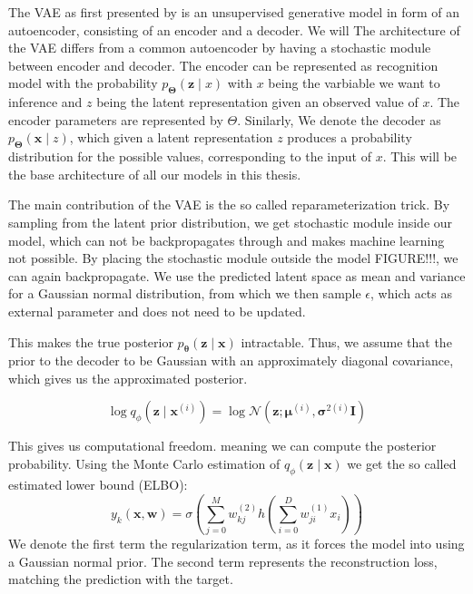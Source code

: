 The VAE as first presented by \cite{kingma_auto-encoding_2014} is an unsupervised generative model in form of an autoencoder, consisting of an encoder and a decoder. We will The architecture of the VAE differs from a common autoencoder by having a stochastic module between encoder and decoder. The encoder can be represented as recognition model with the probability $p_{\boldsymbol{\Theta}}(\mathbf{z} \mid x)$ with $x$ being the varbiable we want to inference and $z$ being the latent representation given an observed value of $x$. The encoder parameters are represented by $\Theta$. Sinilarly, We denote the decoder as $p_{\boldsymbol{\Theta}}(\mathbf{x} \mid z)$, which given a latent representation $z$ produces a probability distribution for the possible values, corresponding to the input of $x$. This will be the base architecture of all our models in this thesis.

The main contribution of the VAE is the so called reparameterization trick. By sampling from the latent prior distribution, we get stochastic module inside our model, which can not be backpropagates through and makes machine learning not possible. By placing the stochastic module outside the model FIGURE!!!, we can again backpropagate. We use the predicted latent space as mean and variance for a Gaussian normal distribution, from which we then sample $\epsilon$, which acts as external parameter and does not need to be updated.

This makes the true posterior $p_{\boldsymbol{\theta}}(\mathbf{z} \mid \mathbf{x})$ intractable. Thus, we assume that the prior to the decoder to be Gaussian with an approximately diagonal covariance, which gives us the approximated posterior.

\begin{equation}
    \log q_{\phi}\left(\mathbf{z} \mid \mathbf{x}^{(i)}\right)=\log \mathcal{N}\left(\mathbf{z} ; \boldsymbol{\mu}^{(i)}, \boldsymbol{\sigma}^{2(i)} \mathbf{I}\right)
\end{equation}
    
This gives us computational freedom. meaning we can compute the posterior probability. Using the Monte Carlo estimation of $q_{\phi}(\mathbf{z} \mid \mathbf{x})$ we get the so called estimated lower bound (ELBO):
\begin{equation}
    y_{k}(\mathbf{x}, \mathbf{w})=\sigma\left(\sum_{j=0}^{M} w_{k j}^{(2)} h\left(\sum_{i=0}^{D} w_{j i}^{(1)} x_{i}\right)\right)
\end{equation}
We denote the first term the regularization term, as it forces the model into using a Gaussian normal prior. The second term represents the reconstruction loss, matching the prediction with the target.

